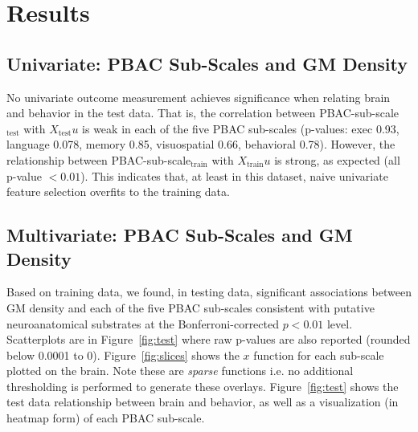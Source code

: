 \documentclass[preprint,authoryear,12pt]{elsarticle}
\begin{document}
\section{Results}


\subsection{Univariate: PBAC Sub-Scales and GM Density} No univariate outcome measurement achieves significance when relating brain and behavior in the test data.  That is, the correlation between PBAC-sub-scale$_\text{test}$ with $X_\text{test} u$ is weak in each of the five PBAC sub-scales (p-values: exec 0.93,  language 0.078,  memory 0.85, visuospatial 0.66, behavioral 0.78).  However, the relationship between PBAC-sub-scale$_\text{train}$ with $X_\text{train} u$ is strong, as expected (all p-value $< 0.01$).  This indicates that, at least in this dataset, naive univariate feature selection overfits to the training data.  

\subsection{Multivariate: PBAC Sub-Scales and GM Density}  
Based on training data, we found, in testing data, significant associations between GM density and each of the five PBAC sub-scales consistent with putative neuroanatomical substrates at the Bonferroni-corrected $p < 0.01$ level.  Scatterplots are in Figure~\ref{fig:test} where raw p-values are also reported (rounded below 0.0001 to 0).  Figure~\ref{fig:slices} shows the $x$ function for each sub-scale plotted on the brain.  Note these are {\em sparse} functions i.e. no additional thresholding is performed to generate these overlays.    Figure~\ref{fig:test} shows the test data relationship between brain and behavior, as well as a visualization (in heatmap form) of each PBAC sub-scale.  
\end{document}

